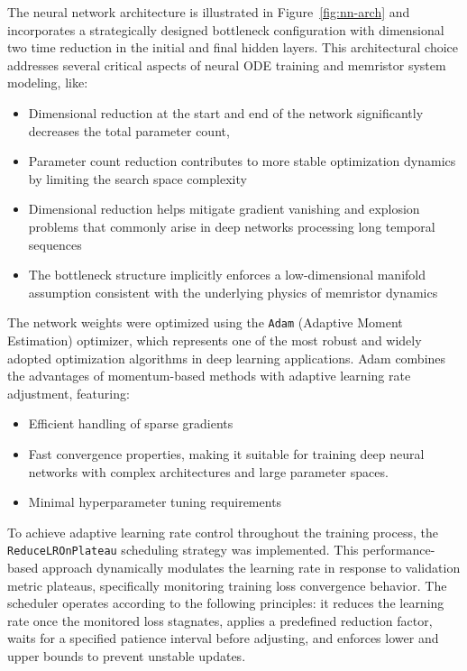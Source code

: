 \documentclass[11pt, oneside]{article}
\begin{document}

The neural network architecture is illustrated in Figure~\ref{fig:nn-arch} and incorporates a strategically designed bottleneck configuration with dimensional two time reduction in the initial and final hidden layers. This architectural choice addresses several critical aspects of neural ODE training and memristor system modeling, like:
\begin{itemize}
    \item Dimensional reduction at the start and end of the network significantly decreases the total parameter count,
    \item  Parameter count reduction contributes to more stable optimization dynamics by limiting the search space complexity
    \item Dimensional reduction helps mitigate gradient vanishing and explosion problems that commonly arise in deep networks processing long temporal sequences
    \item  The bottleneck structure implicitly enforces a low-dimensional manifold assumption consistent with the underlying physics of memristor dynamics
\end{itemize}


The network weights were optimized using the \texttt{Adam} (Adaptive Moment Estimation) optimizer, which represents one of the most robust and widely adopted optimization algorithms in deep learning applications. Adam combines the advantages of momentum-based methods with adaptive learning rate adjustment, featuring:
\begin{itemize}
    \item Efficient handling of sparse gradients
    \item Fast convergence properties, making it suitable for training deep neural networks with complex architectures and large parameter spaces.
    \item Minimal hyperparameter tuning requirements
\end{itemize}



To achieve adaptive learning rate control throughout the training process, the \texttt{ReduceLROnPlateau} scheduling strategy was implemented. This performance-based approach dynamically modulates the learning rate in response to validation metric plateaus, specifically monitoring training loss convergence behavior. The scheduler operates according to the following principles: it reduces the learning rate once the monitored loss stagnates, applies a predefined reduction factor, waits for a specified patience interval before adjusting, and enforces lower and upper bounds to prevent unstable updates.
\end{document}
